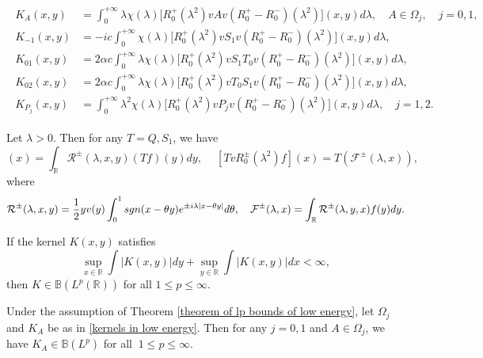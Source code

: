 \documentclass[10pt,a4paper]{amsart}
\newcommand\B{\mathbb{B}}
\newcommand\R{\mathbb{R}}
\newcommand\mcaF{\mathcal{F}}
\newcommand\mcaR{\mathcal{R}}
\begin{document}
\begin{theorem}
\begin{itemize}
\begin{align}
\begin{split}
K_A(x,y)&=\int_{0}^{+\infty}\lambda\chi(\lambda)\big[R^+_0(\lambda^{2})vAv(R^+_0-R^-_0)(\lambda^{2})\big](x,y)d\lambda,\quad A\in\Omega_j,\quad j=0,1,\\
K_{-1}(x,y)&=-ic\int_{0}^{+\infty}\chi(\lambda)\big[R^+_0(\lambda^{2})vS_1v(R^+_0-R^-_0)(\lambda^{2})\big](x,y)d\lambda,\\
K_{01}(x,y)&=2\alpha c\int_{0}^{+\infty}\lambda\chi(\lambda)\big[R^+_0(\lambda^{2})vS_1T_0v(R^+_0-R^-_0)(\lambda^{2})\big](x,y)d\lambda,\\
K_{02}(x,y)&=2\alpha c\int_{0}^{+\infty}\lambda\chi(\lambda)\big[R^+_0(\lambda^{2})vT_0S_1v(R^+_0-R^-_0)(\lambda^{2})\big](x,y)d\lambda,\\
K_{P_{j}}(x,y)&=\int_{0}^{+\infty}\lambda^2\chi(\lambda)\big[R^+_0(\lambda^{2})vP_jv(R^+_0-R^-_0)(\lambda^{2})\big](x,y)d\lambda,\quad j=1,2.
\end{split}
\end{align}
\end{itemize}
\end{theorem}

\begin{lemma}\label{cancel lemma}
Let $\lambda>0$. Then for any $T=Q,S_1$, we have
\begin{equation*}
 [R^{\pm}_0(\lambda^2)vTf](x)=\int_{\R}\mcaR^{\pm}(\lambda,x,y)(Tf)(y)dy,\quad\ [TvR^{\pm}_0(\lambda^2)f](x)=T(\mcaF^{\pm}(\lambda,x)),
\end{equation*}
where 
\begin{equation*}
\mcaR^{\pm}(\lambda,x,y)=\frac{1}{2}yv(y)\int_{0}^{1}{\rm sgn}(x-\theta y)e^{\pm i \lambda|x-\theta y|}d\theta,\quad \mcaF^{\pm}(\lambda,x)=\int_{\R}\mcaR^{\pm}(\lambda,y,x)f(y)dy.
\end{equation*}
\end{lemma}

\begin{lemma}\label{shur test}
If the kernel $K(x,y)$ satisfies $$\sup_{x\in\R}\int|K(x,y)|dy+\sup_{y\in\R}\int|K(x,y)|dx<\infty,$$ then $K\in \B(L^{p}(\R))$ for all $1\leq p\leq \infty.$
\end{lemma}

\begin{proposition}\label{good1}
Under the assumption of Theorem {\rm\ref{theorem of lp bounds of low energy}}, let $\Omega_j$ and $K_A$ be as in \eqref{kernels in low energy}. Then for any $j=0,1$ and $A\in\Omega_j$, we have $K_A\in\B(L^p)$ for all $\ 1\leq p\leq\infty$.
\end{proposition}
\end{document}
